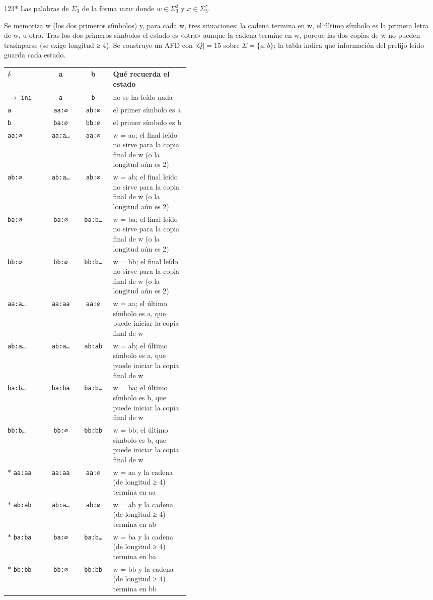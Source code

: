 \documentclass[11pt]{article}
\begin{document}
\begin{ejercicio}{123}{*}
Las palabras de $\Sigma_3$ de la forma $wxw$ donde $w \in \Sigma_3^2$ y $x \in \Sigma_3^*$.
\end{ejercicio}
\proc Se memoriza w (los dos primeros símbolos) y, para cada w, tres situaciones: la cadena termina en w, el último símbolo es la primera letra de w, u otra. Tras los dos primeros símbolos el estado es «otra» aunque la cadena termine en w, porque las dos copias de w no pueden traslaparse (se exige longitud ≥ 4). Se construye un AFD con $|Q| = 15$ sobre $\Sigma = \{a, b\}$; la tabla indica qué información del prefijo leído guarda cada estado.
\begin{center}\small\begin{tabular}{lccp{0.42\linewidth}}\toprule
$\delta$ & a & b & Qué recuerda el estado \\\midrule
$\to$ \texttt{ini} & \texttt{a} & \texttt{b} & no se ha leído nada \\
 \texttt{a} & \texttt{aa:∅} & \texttt{ab:∅} & el primer símbolo es a \\
 \texttt{b} & \texttt{ba:∅} & \texttt{bb:∅} & el primer símbolo es b \\
 \texttt{aa:∅} & \texttt{aa:a…} & \texttt{aa:∅} & w = aa; el final leído no sirve para la copia final de w (o la longitud aún es 2) \\
 \texttt{ab:∅} & \texttt{ab:a…} & \texttt{ab:∅} & w = ab; el final leído no sirve para la copia final de w (o la longitud aún es 2) \\
 \texttt{ba:∅} & \texttt{ba:∅} & \texttt{ba:b…} & w = ba; el final leído no sirve para la copia final de w (o la longitud aún es 2) \\
 \texttt{bb:∅} & \texttt{bb:∅} & \texttt{bb:b…} & w = bb; el final leído no sirve para la copia final de w (o la longitud aún es 2) \\
 \texttt{aa:a…} & \texttt{aa:aa} & \texttt{aa:∅} & w = aa; el último símbolo es a, que puede iniciar la copia final de w \\
 \texttt{ab:a…} & \texttt{ab:a…} & \texttt{ab:ab} & w = ab; el último símbolo es a, que puede iniciar la copia final de w \\
 \texttt{ba:b…} & \texttt{ba:ba} & \texttt{ba:b…} & w = ba; el último símbolo es b, que puede iniciar la copia final de w \\
 \texttt{bb:b…} & \texttt{bb:∅} & \texttt{bb:bb} & w = bb; el último símbolo es b, que puede iniciar la copia final de w \\
$*$ \texttt{aa:aa} & \texttt{aa:aa} & \texttt{aa:∅} & w = aa y la cadena (de longitud ≥ 4) termina en aa \\
$*$ \texttt{ab:ab} & \texttt{ab:a…} & \texttt{ab:∅} & w = ab y la cadena (de longitud ≥ 4) termina en ab \\
$*$ \texttt{ba:ba} & \texttt{ba:∅} & \texttt{ba:b…} & w = ba y la cadena (de longitud ≥ 4) termina en ba \\
$*$ \texttt{bb:bb} & \texttt{bb:∅} & \texttt{bb:bb} & w = bb y la cadena (de longitud ≥ 4) termina en bb \\
\bottomrule\end{tabular}\end{center}
\end{document}
